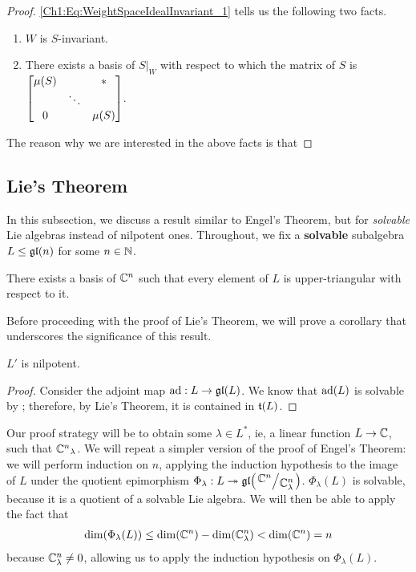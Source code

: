 \begin{proof}
    \eqref{Ch1:Eq:WeightSpaceIdealInvariant_1} tells us the following two facts.
    \begin{enumerate}
        \item $W$ is $S$-invariant.

        \item There exists a basis of $S\vert_{W}$ with respect to which the matrix of $S$ is
        $\displaystyle \begin{bmatrix}
            \mu\!\left( S \right) & & * \\
            & \ddots & \\
            0 & & \mu\!\left( S \right)
        \end{bmatrix}$.
    \end{enumerate}

    The reason why we are interested in the above facts is that 

    \sorry
\end{proof}

\subsection{Lie's Theorem}

In this subsection, we discuss a result similar to Engel's Theorem, but for \textit{solvable} Lie algebras instead of nilpotent ones. Throughout, we fix a \textbf{solvable} subalgebra $L \leq \mathfrak{gl}\!\left( n \right)$ for some $n \in \mathbb{N}$.

\begin{boxtheorem}\label{Ch1:Thm:Lie}
    There exists a basis of $\mathbb{C}^n$ such that every element of $L$ is upper-triangular with respect to it.
\end{boxtheorem}

Before proceeding with the proof of Lie's Theorem, we will prove a corollary that underscores the significance of this result.

\begin{boxcorollary}\label{Ch1:Cor:SolvableDerivNilpotent}
    $L'$ is nilpotent.
\end{boxcorollary}
\begin{proof}
    Consider the adjoint map $\operatorname{ad} : L \to \mathfrak{gl}\!\left( L \right)$. We know that $\operatorname{ad}\!\left( L \right)$ is solvable by \sorry; therefore, by Lie's Theorem, it is contained in $\mathfrak{t}\!\left( L \right)$. %
    \sorry
\end{proof}

Our proof strategy will be to obtain some $\lambda \in L^*$, ie, a linear function $L \to \mathbb{C}$, such that ${\mathbb{C}^n}_{\lambda}$. We will repeat a simpler version of the proof of Engel's Theorem: we will perform induction on $n$, applying the induction hypothesis to the image of $L$ under the quotient epimorphism $\Phi_\lambda : L \surj \gl{\quotient{\C^n}{\C^n_\lambda}}$. $\Phi_\lambda(L)$ is solvable, because it is a quotient of a solvable Lie algebra. We will then be able to apply the fact that
\begin{align*}
    \dim\!\left( \Phi_\lambda(L) \right)
    \leq \dim\!\left( \mathbb{C}^n \right) - \dim\!\left( \mathbb{C}^n_\lambda \right)
    < \dim\!\left( \mathbb{C}^n \right) = n
\end{align*}
because $\mathbb{C}^n_{\lambda} \neq 0$, allowing us to apply the induction hypothesis on $\Phi_\lambda(L)$.


